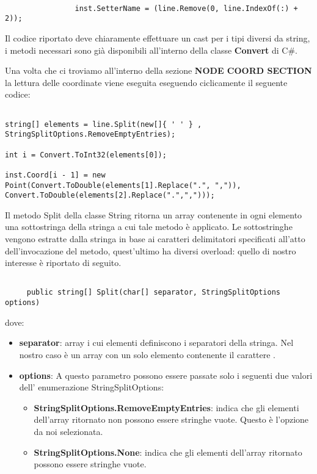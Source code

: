 \documentclass[11pt]{article}
\begin{document}
\begin{lstlisting}

                inst.SetterName = (line.Remove(0, line.IndexOf(:) + 2));

\end{lstlisting}

Il codice riportato deve chiaramente effettuare un cast per i tipi diversi da string, i metodi necessari sono già disponibili all'interno della classe \textbf{Convert} di C\#.

Una volta che ci troviamo all'interno della sezione \textbf{NODE COORD SECTION} la lettura delle coordinate viene eseguita eseguendo ciclicamente il seguente codice:

\begin{lstlisting}

string[] elements = line.Split(new[]{ ' ' } , StringSplitOptions.RemoveEmptyEntries);

int i = Convert.ToInt32(elements[0]);

inst.Coord[i - 1] = new Point(Convert.ToDouble(elements[1].Replace(".", ",")), Convert.ToDouble(elements[2].Replace(".",",")));
\end{lstlisting}

Il metodo Split della classe String ritorna un array contenente in ogni elemento una sottostringa della stringa a cui tale metodo è applicato. Le sottostringhe vengono estratte dalla stringa in base ai caratteri delimitatori specificati all'atto dell'invocazione del metodo, quest'ultimo ha diversi overload: quello di nostro interesse è riportato di seguito.

\begin{lstlisting}

     public string[] Split(char[] separator, StringSplitOptions options)

\end{lstlisting}

dove:

\begin{itemize}
\item \textbf{separator}: array i cui elementi definiscono i separatori della stringa. Nel nostro caso è un array con un solo elemento contenente il carattere    .
\item \textbf{options}: A questo parametro possono essere passate solo i seguenti due valori dell' enumerazione StringSplitOptions:

\begin{itemize}

\item \textbf{StringSplitOptions.RemoveEmptyEntries}: indica che gli elementi dell'array ritornato non possono essere stringhe vuote. Questo è l'opzione da noi selezionata.
\item \textbf{StringSplitOptions.None}: indica che gli elementi dell'array ritornato possono essere stringhe vuote.

\end{itemize}

\end{itemize}
\end{document}
